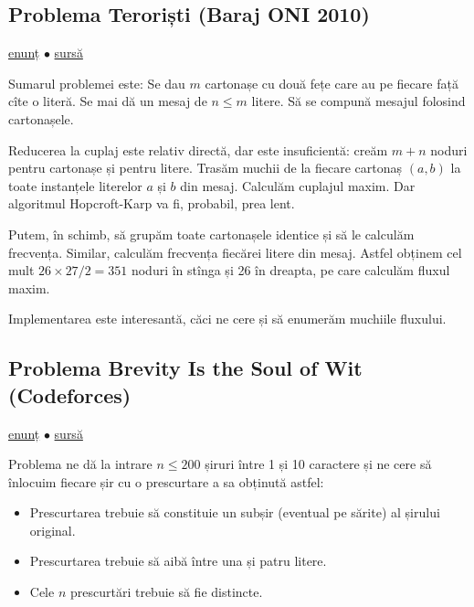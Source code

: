 \documentclass[../main.tex]{subfiles}
\begin{document}
\subsection{Problema Teroriști (Baraj ONI 2010)}
\label{problem:teroristi}

\href{https://kilonova.ro/problems/1777}{enunț}
$\bullet$
\hyperref[code:teroristi]{sursă}

Sumarul problemei este: Se dau $m$ cartonașe cu două fețe care au pe fiecare față cîte o literă. Se mai dă un mesaj de $n \leq m$ litere. Să se compună mesajul folosind cartonașele.

Reducerea la cuplaj este relativ directă, dar este insuficientă: creăm $m + n$ noduri pentru cartonașe și pentru litere. Trasăm muchii de la fiecare cartonaș $(a, b)$ la toate instanțele literelor $a$ și $b$ din mesaj. Calculăm cuplajul maxim. Dar algoritmul Hopcroft-Karp va fi, probabil, prea lent.

Putem, în schimb, să grupăm toate cartonașele identice și să le calculăm frecvența. Similar, calculăm frecvența fiecărei litere din mesaj. Astfel obținem cel mult $26 \times 27 / 2 = 351$ noduri în stînga și 26 în dreapta, pe care calculăm fluxul maxim.

Implementarea este interesantă, căci ne cere și să enumerăm muchiile fluxului.


\subsection{Problema Brevity Is the Soul of Wit (Codeforces)}
\label{problem:brevity-is-the-soul-of-wit}

\href{https://codeforces.com/contest/120/problem/H}{enunț}
$\bullet$
\hyperref[code:brevity-is-the-soul-of-wit]{sursă}

Problema ne dă la intrare $n \leq 200$ șiruri între 1 și 10 caractere și ne cere să înlocuim fiecare șir cu o prescurtare a sa obținută astfel:

\begin{itemize}
  \item Prescurtarea trebuie să constituie un subșir (eventual pe sărite) al șirului original.

  \item Prescurtarea trebuie să aibă între una și patru litere.

  \item Cele $n$ prescurtări trebuie să fie distincte.
\end{itemize}
\end{document}
